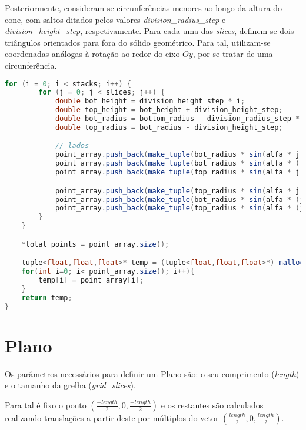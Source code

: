 \documentclass[14pt, a4 paper]{report}
\begin{document}
Posteriormente, consideram-se circunferências menores ao longo da altura do cone, com saltos ditados pelos valores \textit{division\_radius\_step} e \textit{division\_height\_step}, respetivamente. Para cada uma das \textit{slices}, definem-se dois triângulos orientados para fora do sólido geométrico. Para tal, utilizam-se coordenadas análogas à rotação ao redor do eixo $Oy$, por se tratar de uma circunferência.

\begin{lstlisting}[language = Java]
    for (i = 0; i < stacks; i++) {
        for (j = 0; j < slices; j++) {
            double bot_height = division_height_step * i;
            double top_height = bot_height + division_height_step;
            double bot_radius = bottom_radius - division_radius_step * i;
            double top_radius = bot_radius - division_height_step;

            // lados
            point_array.push_back(make_tuple(bot_radius * sin(alfa * j), bot_height, bot_radius * cos(alfa * j)));
            point_array.push_back(make_tuple(bot_radius * sin(alfa * (j + 1)), bot_height, bot_radius * cos(alfa * (j + 1))));
            point_array.push_back(make_tuple(top_radius * sin(alfa * j), top_height, top_radius * cos(alfa * j)));

            point_array.push_back(make_tuple(top_radius * sin(alfa * j), top_height, top_radius * cos(alfa * j)));
            point_array.push_back(make_tuple(bot_radius * sin(alfa * (j + 1)), bot_height, bot_radius * cos(alfa * (j + 1))));
            point_array.push_back(make_tuple(top_radius * sin(alfa * (j + 1)), top_height, top_radius * cos(alfa * (j + 1))));
        }
    }

    *total_points = point_array.size();

    tuple<float,float,float>* temp = (tuple<float,float,float>*) malloc(sizeof(tuple<float,float,float>) * point_array.size());
    for(int i=0; i< point_array.size(); i++){
        temp[i] = point_array[i];
    }
    return temp;
}
\end{lstlisting}

\section{Plano}
Os parâmetros necessários para definir um Plano são: o seu comprimento (\textit{length}) e o tamanho da grelha (\textit{grid\_slices}).

Para tal é fixo o ponto $(\frac{-length}{2},0,\frac{-length}{2})$ e os restantes são calculados realizando translações a partir deste por múltiplos do vetor $(\frac{length}{2},0,\frac{length}{2})$.
\end{document}
